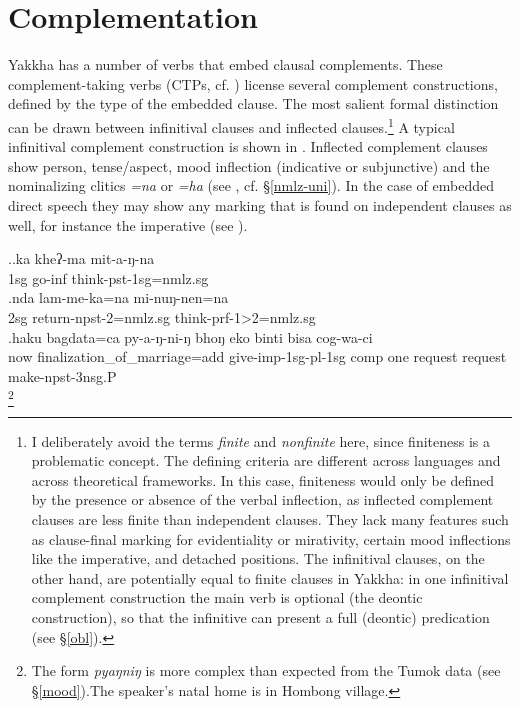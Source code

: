 \chapter{Complementation}\label{compl}

Yakkha has a number of  verbs that embed  clausal complements. These com\-ple\-ment-taking verbs (CTPs, cf. \citealt{Noonan2007Complementation}) license several complement constructions, defined by the type of the embedded clause. The most salient formal distinction can be drawn between infinitival clauses and inflected clauses.\footnote{I deliberately avoid the terms \emph{finite} and \emph{nonfinite} here, since finiteness is a problematic concept. The defining criteria are different across languages and across theoretical frameworks. In this case, finiteness would only be defined by the presence or absence of the verbal inflection, as inflected complement clauses are less finite than independent clauses. They lack many features such as clause-final marking for evidentiality or mirativity, certain mood inflections like the imperative, and detached positions. The infinitival clauses, on the other hand, are potentially equal to finite clauses in Yakkha: in one infinitival complement construction the main verb is optional (the deontic construction), so that the infinitive can present a full (deontic) predication (see §\ref{obl}).} A typical infinitival complement construction is shown in \Next[a]. Inflected complement clauses show person, tense/aspect, mood inflection (indicative  or subjunctive) and the nominalizing clitics \emph{=na} or \emph{=ha}  (see \Next[b], cf. §\ref{nmlz-uni}). In the case of embedded direct speech they may show any marking that is found on independent clauses as well, for instance the imperative (see \Next[c]). 

\ex.\ag.ka kheʔ-ma mit-a-ŋ-na\\
{\sc 1sg} go{\sc -inf} think{\sc -pst-1sg=nmlz.sg}\\
\bg.nda lam-me-ka=na mi-nuŋ-nen=na\\
{\sc 2sg} return{\sc -npst-2=nmlz.sg} think{\sc -prf-1>2=nmlz.sg}\\
\bg.haku bagdata=ca   py-a-ŋ-ni-ŋ  bhoŋ eko binti   bisa       cog-wa-ci\\
now finalization\_of\_marriage{\sc =add} give{\sc -imp-1sg-pl-1sg} {\sc comp} one request request make{\sc -npst-3nsg.P}\\
\footnote{The form \emph{pyaŋniŋ} is more complex than expected from the Tumok data (see §\ref{mood}).The speaker's natal home is in Hombong village.} 


